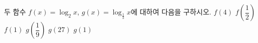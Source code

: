 두 함수 $f(x)=\log_2 x$, $g(x)=\log_{\frac{1}{3}} x$에 대하여 다음을 구하시오.
 $f(4)$
 $f\left(\dfrac{1}{2}\right)$
 $f(1)$
 $g\left(\dfrac{1}{9}\right)$
 $g(27)$
 $g(1)$
